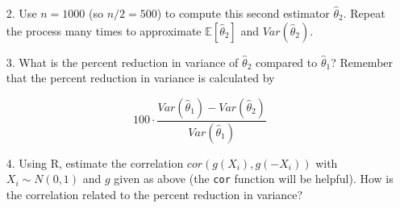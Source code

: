 \documentclass[12pt]{article}
\begin{document}
\begin{enumerate}
\item[2.] Use $n = 1000$ (so $n/2 = 500$) to compute this second estimator $\widehat{\theta}_2$. Repeat the process many times to approximate $\mathbb{E}[\widehat{\theta}_2]$ and $Var(\widehat{\theta}_2)$.

\vspace{4cm}

\item[3.] What is the percent reduction in variance of $\widehat{\theta}_2$ compared to $\widehat{\theta}_1$? Remember that the percent reduction in variance is calculated by

$$100 \cdot\dfrac{Var(\widehat{\theta}_1) - Var(\widehat{\theta}_2)}{Var(\widehat{\theta}_1)}$$

\vspace{4cm}

\item[4.] Using R, estimate the correlation $cor(g(X_i), g(-X_i))$ with $X_i \sim N(0, 1)$ and $g$ given as above (the \texttt{cor} function will be helpful). How is the correlation related to the percent reduction in variance?
\end{enumerate}
\end{document}
